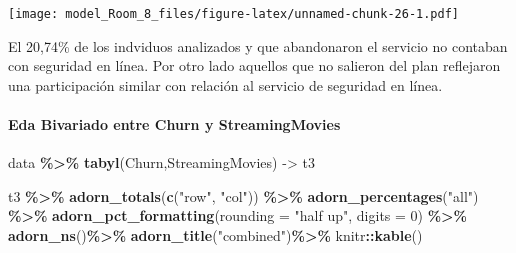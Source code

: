 \documentclass[
]{article}
\newenvironment{Shaded}{\begin{snugshade}}{\end{snugshade}}
\newcommand{\AttributeTok}[1]{\textcolor[rgb]{0.13,0.29,0.53}{#1}}
\newcommand{\DecValTok}[1]{\textcolor[rgb]{0.00,0.00,0.81}{#1}}
\newcommand{\FunctionTok}[1]{\textcolor[rgb]{0.13,0.29,0.53}{\textbf{#1}}}
\newcommand{\NormalTok}[1]{#1}
\newcommand{\OtherTok}[1]{\textcolor[rgb]{0.56,0.35,0.01}{#1}}
\newcommand{\SpecialCharTok}[1]{\textcolor[rgb]{0.81,0.36,0.00}{\textbf{#1}}}
\newcommand{\StringTok}[1]{\textcolor[rgb]{0.31,0.60,0.02}{#1}}
\begin{document}
\texttt{[image: model\_Room\_8\_files/figure-latex/unnamed-chunk-26-1.pdf]}

El 20,74\% de los indviduos analizados y que abandonaron el servicio no
contaban con seguridad en línea. Por otro lado aquellos que no salieron
del plan reflejaron una participación similar con relación al servicio
de seguridad en línea.

\hypertarget{eda-bivariado-entre-churn-y-streamingmovies}{%
\paragraph{Eda Bivariado entre Churn y
StreamingMovies}\label{eda-bivariado-entre-churn-y-streamingmovies}}

\begin{Shaded}
\begin{Highlighting}[]
\NormalTok{data }\SpecialCharTok{\%\textgreater{}\%} \FunctionTok{tabyl}\NormalTok{(Churn,StreamingMovies) }\OtherTok{{-}\textgreater{}}\NormalTok{ t3}

\NormalTok{t3 }\SpecialCharTok{\%\textgreater{}\%} \FunctionTok{adorn\_totals}\NormalTok{(}\FunctionTok{c}\NormalTok{(}\StringTok{"row"}\NormalTok{, }\StringTok{"col"}\NormalTok{)) }\SpecialCharTok{\%\textgreater{}\%} \FunctionTok{adorn\_percentages}\NormalTok{(}\StringTok{"all"}\NormalTok{) }\SpecialCharTok{\%\textgreater{}\%}
\FunctionTok{adorn\_pct\_formatting}\NormalTok{(}\AttributeTok{rounding =} \StringTok{"half up"}\NormalTok{, }\AttributeTok{digits =} \DecValTok{0}\NormalTok{) }\SpecialCharTok{\%\textgreater{}\%} \FunctionTok{adorn\_ns}\NormalTok{()}\SpecialCharTok{\%\textgreater{}\%} \FunctionTok{adorn\_title}\NormalTok{(}\StringTok{"combined"}\NormalTok{)}\SpecialCharTok{\%\textgreater{}\%}\NormalTok{ knitr}\SpecialCharTok{::}\FunctionTok{kable}\NormalTok{()}
\end{Highlighting}
\end{Shaded}
\end{document}
